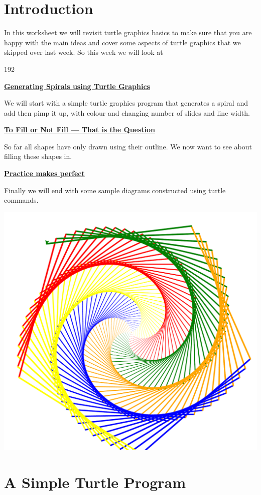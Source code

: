 \documentclass{coderdojo}
\begin{document}
\maketitle


\section*{Introduction}

In this worksheet we will revisit turtle graphics basics to make sure that you are happy with the main ideas and cover some aspects of turtle graphics that we skipped over last week. So this week we will look at 


\begin{dingautolist}{192}
\item \hyperref[sec:spiral]{\color{section}\bfseries Generating Spirals using Turtle Graphics}

We will start with a simple turtle graphics program that generates a spiral and add then pimp it up, with colour and changing number of slides and line width.
 
 
\item \hyperref[sec:fill]{\color{section}\bfseries To Fill or Not Fill --- That is the Question}

So far all shapes have only drawn using their outline.  We now want to see about filling these shapes in. 


\item \hyperref[sec:tasks]{\color{section}\bfseries Practice makes perfect}

Finally we will end with some sample diagrams constructed using turtle commands.
 
\end{dingautolist}

\centerline{\includegraphics[clip,trim=0 0 0 0, width=.4\textwidth]{code/Color_Spiral_d.pdf}}
 
\clearpage

\section{A Simple Turtle Program}\label{sec:spiral}
\end{document}
